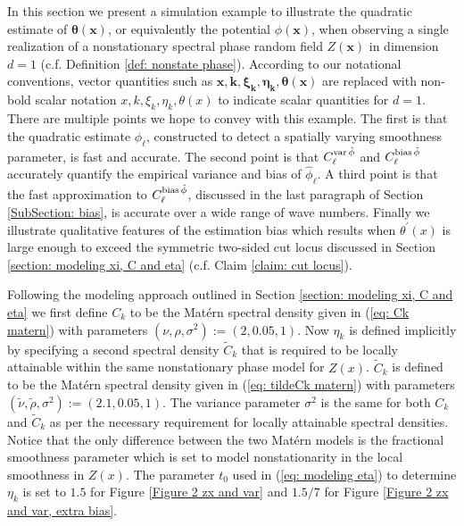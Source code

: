 \documentclass[10pt,noinfoline]{imsart}
\newcommand{\bs}{\boldsymbol}
\begin{document}
\label{section: nonstat example d=1}






In this section we present a simulation example to illustrate the quadratic estimate of $\bs \theta(\bs x)$, or equivalently the potential $\phi(\bs x)$, when observing a single realization of a nonstationary spectral phase random field $Z(\bs x)$ in dimension $d=1$ (c.f. Definition \ref{def: nonstate phase}).  According to our notational conventions, vector quantities such as  $\bs x, \bs k, \bs \xi_{\bs k},  \bs\eta_{\bs k}, \bs \theta(\bs x)$ are replaced with non-bold scalar notation $x, k, \xi_{k},  \eta_{k}, \theta(x)$ to indicate scalar quantities for $d=1$. There are multiple points we hope to convey with this example. The first is that the quadratic estimate $\hat\phi_\ell$, constructed to detect a spatially varying smoothness parameter, is fast and accurate. The second point is that $C^{\text{var\,}\hat\phi}_{\ell}$ and $C^{\text{bias\,}\hat\phi}_{\ell}$  accurately quantify the empirical variance and bias of $\hat\phi_\ell$. A third point is that the fast approximation to $C^{\text{bias\,}\hat\phi}_{\ell}$, discussed in the last paragraph of Section \ref{SubSection: bias}, is accurate over a wide range of wave numbers. Finally we illustrate qualitative features of the estimation bias which results when $\theta^\prime(x)$ is large enough to exceed the symmetric two-sided cut locus discussed in Section \ref{section: modeling xi, C and eta} (c.f. Claim \ref{claim: cut locus}).





Following the modeling approach outlined in Section \ref{section: modeling xi, C and eta} we first define $C_k$ to be the  Mat\'ern spectral density given in (\ref{eq: Ck matern}) with parameters $(\nu, \rho, \sigma^2):=(2, 0.05, 1)$. Now  $\eta_k$ is defined implicitly by specifying a second spectral density $\tilde C_k$ that is required to be locally attainable within the same nonstationary phase model for $Z(x)$. $\tilde C_k$ is defined to be the  Mat\'ern spectral density given in (\ref{eq: tildeCk matern})  with parameters $(\tilde \nu, \tilde\rho, \sigma^2):=(2.1, 0.05, 1)$. The variance parameter $\sigma^2$ is the same for both $C_k$ and  $\tilde C_k$ as per the necessary requirement for locally attainable spectral densities. Notice that the only difference between the two Mat\'ern models is the fractional smoothness parameter which is set to model nonstationarity in the local smoothness in $Z(x)$.  The parameter $t_0$ used in (\ref{eq: modeling eta}) to determine $\eta_k$ is set to $1.5$ for Figure \ref{Figure 2 zx and var} and $1.5/7$ for Figure \ref{Figure 2 zx and var, extra bias}. 
\end{document}
